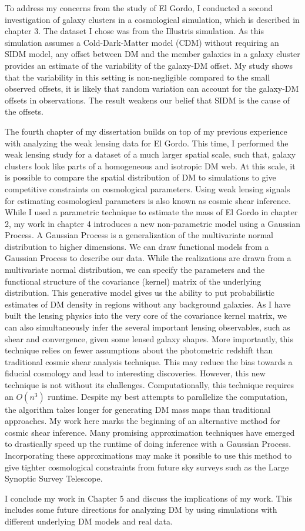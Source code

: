 \documentclass[ucdthesis.tex]{subfiles}
\begin{document}
		To address my concerns from the study of El Gordo, 
		I conducted a second investigation of galaxy clusters in a cosmological
		simulation, which is described in chapter 3. The dataset I chose was from 
		the Illustris simulation. As this simulation
		assumes a Cold-Dark-Matter model (CDM) without requiring an SIDM model, 
		any offset between DM and the member galaxies in a 
		galaxy cluster provides an estimate of the variability of the galaxy-DM offset.  My
		study shows that 
		the variability in this setting is non-negligible compared to the
		small observed offsets, it is
		likely that random variation can account for the
		galaxy-DM offsets in observations. The result weakens our belief that SIDM is the
		cause of the offsets. 

			The fourth chapter of my dissertation builds on top of my previous experience
			with analyzing the weak lensing data for El Gordo. This time, I performed 
			the weak lensing study for a dataset of a much larger spatial scale, 
			such that, galaxy
		clusters look like parts of a homogeneous and isotropic DM web. At this scale,
		it is possible to compare the spatial distribution of DM to simulations to give 
		competitive constraints on cosmological parameters. Using weak lensing
		signals for estimating cosmological parameters is also known as cosmic shear 
		inference. While I used a parametric technique to estimate the mass of El
		Gordo in chapter 2, 
		my work in chapter 4 introduces a new non-parametric model using a Gaussian Process.
		A Gaussian Process is a generalization of the multivariate normal distribution 
		to higher dimensions. We can draw functional models from a Gaussian Process
		to describe our data. While the realizations are drawn from a multivariate
		normal distribution,  we can specify the parameters and the
		functional structure of the covariance (kernel) matrix of the underlying 
		distribution. 
		This generative model gives us the ability to put probabilistic estimates 
		of DM density in regions without any background galaxies. 
		As I have built the lensing physics into the 
		very core of the covariance kernel matrix, we can also simultaneously infer the
		several important lensing observables, such as shear and convergence, 
		given some lensed galaxy shapes. 
		More importantly, this technique relies on fewer assumptions about the
		photometric redshift than traditional cosmic shear analysis technique. 
		This may reduce
		the bias towards a fiducial cosmology and lead to interesting discoveries.
		However, this new technique is not without its challenges. Computationally,
		this technique requires an $O(n^3)$ runtime. Despite my best attempts to
		parallelize the computation, the algorithm takes longer for
	  generating DM mass maps than traditional approaches. My work here
		marks the beginning of an alternative method for cosmic
		shear inference. Many promising approximation techniques have emerged to 
		drastically speed up the runtime of doing inference with a Gaussian Process.
		Incorporating these approximations may make it possible to use this method 
		to give tighter cosmological constraints  
		from future sky surveys such as the Large Synoptic Survey Telescope.  

		I conclude my work in Chapter 5 and discuss the implications of my work.
		This includes some future directions for analyzing DM
		by using simulations with different underlying DM
		models and real data. 
     
    \newpage
		
\end{document}
